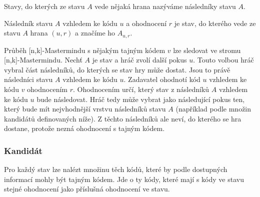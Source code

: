 Stavy, do kterých ze stavu $A$ vede nějaká hrana nazýváme následníky stavu $A$. 

\begin{definice}\label{potomek}
  
  Následník stavu $A$ vzhledem ke kódu $u$ a ohodnocení $r$ je stav, do kterého vede ze stavu $A$ hrana $(u,r)$ a značíme ho $A_{u,r}$. 
  
\end{definice}

Průběh [n,k]-Mastermindu s nějakým tajným kódem $v$ lze sledovat ve stromu [n,k]-Mastermindu. Nechť $A$ je stav a hráč zvolí další pokus $u$. Touto volbou hráč vybral část následníků, do kterých se stav hry může dostat. Jsou to právě následníci stavu $A$ vzhledem ke kódu $u$. Zadavatel ohodnotí kód $u$ vzhledem ke kódu $v$ ohodnocením $r$. Ohodnocením určí, který stav z následníků $A$ vzhledem ke kódu $u$ bude následovat. Hráč tedy může vybrat jako následující pokus ten, který bude mít nejvhodnější vrstvu následníků stavu $A$ (například podle množin kandidátů definovaných níže). Z těchto následníků ale neví, do kterého se hra dostane, protože nezná ohodnocení s tajným kódem. 


\subsubsection{Kandidát}
Pro každý stav lze nalézt množinu těch kódů, které by podle dostupných informací mohly být tajným kódem. Jde o ty kódy, které mají s kódy ve stavu stejné ohodnocení jako příslušná ohodnocení ve stavu. 


